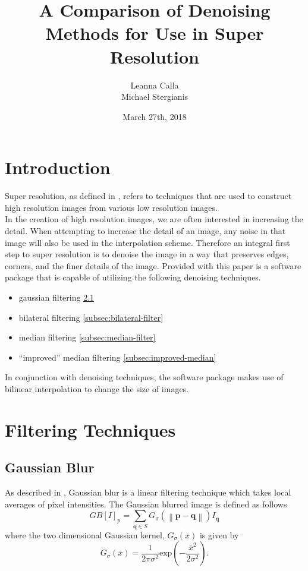 \documentclass{article}
\title{A Comparison of Denoising Methods for Use in Super Resolution}
\author{Leanna Calla \\ Michael Stergianis}
\date{March 27th, 2018}
\newcommand{\norm}[1]{\left\| #1 \right\|}
\begin{document}
\maketitle
%
%
\section{Introduction}
\label{sec:introduction}
Super resolution, as defined in \cite{Yang}, refers to techniques that
are used to construct high resolution images from various low
resolution images. \\

In the creation of high resolution images, we are often interested in
increasing the detail. When attempting to increase the detail of an image, any noise in
that image will also be used in the interpolation scheme. Therefore
an integral first step to super resolution is to denoise the image
in a way that preserves edges, corners, and the finer details of the
image.
%
Provided with this paper is a software package that is capable of
utilizing the following denoising techniques.
\begin{itemize}
  \item gaussian filtering \ref{subsec:gauss-blur}
  \item bilateral filtering \ref{subsec:bilateral-filter}
  \item median filtering \ref{subsec:median-filter}
  \item ``improved'' median filtering \ref{subsec:improved-median}
\end{itemize}
%
In conjunction with denoising techniques, the software package makes
use of bilinear interpolation to change the size of images.
%
\section{Filtering Techniques}
\label{sec:filter-tech}
\subsection{Gaussian Blur}
\label{subsec:gauss-blur}
As described in \cite{bilateral}, Gaussian blur is a linear filtering
technique which takes local averages of pixel intensities. The
Gaussian blurred image is defined as follows
\[GB[I]_p = \displaystyle \sum_{\textbf{q} \in S}G_{\sigma} \left(
    \norm{\textbf{p} - \textbf{q}}\right)I_{\textbf{q}} \]
where the two dimensional Gaussian kernel, $G_{\sigma}(x)$ is given by
\[G_{\sigma}(\bar{x}) = \frac{1}{2 \pi \sigma^2} \text{exp} \left(-
    \frac{\bar{x}^2}{2 \sigma^2}\right). \]
%
\end{document}
